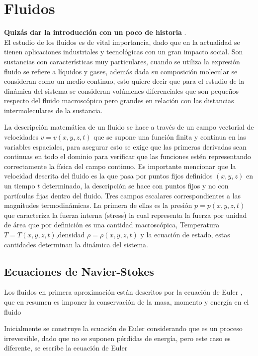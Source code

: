 \chapter{Fluidos}

\textbf{Quizás dar la introducción con un poco de historia }.\\

El estudio de los fluidos es de vital importancia, dado que en la actualidad se tienen aplicaciones industriales y tecnológicas con un gran impacto social. Son sustancias con características muy particulares, cuando se utiliza la expresión fluido se refiere a líquidos y gases, además dada su composición molecular se consideran como un medio continuo, esto quiere decir que para el estudio de la dinámica del sistema se consideran volúmenes diferenciales que son pequeños respecto del fluido macroscópico pero grandes en relación con las distancias intermoleculares de la sustancia.

\noindent La descripción matemática de un fluido se hace a través de un campo vectorial de velocidades $v = v(x,y,z,t)$ que se supone una función finita y continua en las variables espaciales, para asegurar esto se exige que las primeras derivadas sean continuas en todo el dominio para verificar que las funciones estén representando correctamente la física del campo continuo. Es importante mencionar que la velocidad descrita del fluido es la que pasa por puntos fijos definidos $(x,y,z)$ en un tiempo $t$ determinado, la descripción se hace con puntos fijos y no con partículas fijas dentro del fluido. Tres campos escalares correspondientes a las magnitudes termodinámicas. La primera de ellas es la presión $p = p(x,y,z,t)$ que caracteriza la fuerza interna (stress) la cual representa la fuerza por unidad de área que por definición es una cantidad macroscópica, Temperatura $T = T(x,y,z,t)$,densidad $\rho = \rho(x,y,z,t)$ y la ecuación de estado, estas cantidades determinan la dinámica del sistema. 




\section{Ecuaciones de Navier-Stokes}

Los fluidos en primera aproximación están descritos por la ecuación de Euler , que en resumen es imponer la conservación de la masa, momento y energía en el fluido\cite{Landau}

\noindent Inicialmente se construye la ecuación de Euler considerando que es un proceso irreversible, dado que no se suponen pérdidas de energía\cite{George}, pero este caso es diferente, se escribe la ecuación de Euler 

